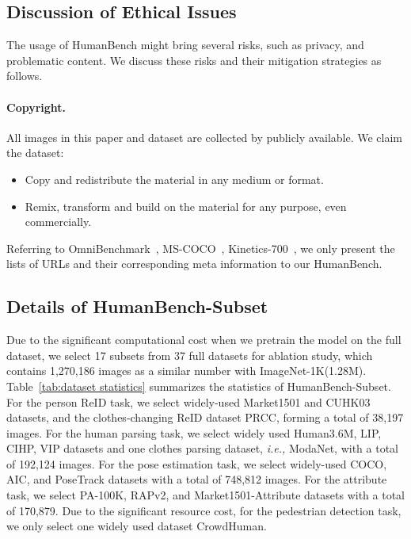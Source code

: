 \documentclass[10pt,twocolumn,letterpaper]{article}
\begin{document}
\subsection{Discussion of Ethical Issues}
The usage of HumanBench might bring several risks, such as privacy, and problematic content. We discuss these risks and their mitigation strategies as follows. 

\paragraph{Copyright.} All images in this paper and dataset are collected by publicly available. We claim the dataset:
\begin{itemize}
    \item Copy and redistribute the material in any medium or format.
    \item Remix, transform and build on the material for any purpose, even commercially.
\end{itemize}
Referring to OmniBenchmark~\cite{zhang2022benchmarking}, MS-COCO~\cite{lin2014microsoft}, Kinetics-700~\cite{carreira2019short}, we only present the lists of URLs and their corresponding meta information to our HumanBench. 

\subsection{Details of HumanBench-Subset}
Due to the significant computational cost when we pretrain the model on the full dataset, we select 17 subsets from 37 full datasets for ablation study, which contains 1,270,186 images as a similar number with ImageNet-1K(1.28M). Table~\ref{tab:dataset statistics} summarizes the statistics of HumanBench-Subset. For the person ReID task, we select widely-used Market1501 and CUHK03 datasets, and the clothes-changing ReID dataset PRCC, forming a total of 38,197 images. For the human parsing task, we select widely used Human3.6M, LIP, CIHP, VIP datasets and one clothes parsing dataset, \emph{i.e.,} ModaNet, with a total of 192,124 images. For the pose estimation task, we select widely-used COCO, AIC, and PoseTrack datasets with a total of 748,812 images. For the attribute task, we select PA-100K, RAPv2, and Market1501-Attribute datasets with a total of 170,879. Due to the significant resource cost, for the pedestrian detection task, we only select one widely used dataset CrowdHuman.
\end{document}
